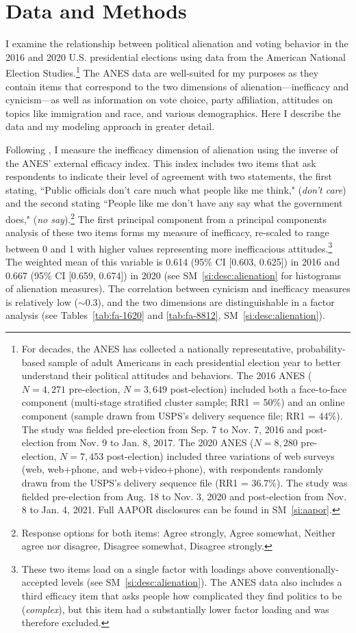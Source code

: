 \documentclass[12pt]{article}
\begin{document}
\section*{Data and Methods}\label{sec:datamethods}
I examine the relationship between political alienation and voting behavior in the 2016 and 2020 U.S. presidential elections using data from the American National Election Studies.\footnote{For decades, the ANES has collected a nationally representative, probability-based sample of adult Americans in each presidential election year to better understand their political attitudes and behaviors. The 2016 ANES ($N = 4,271$ pre-election, $N = 3,649$ post-election) included both a face-to-face component (multi-stage stratified cluster sample; RR1 = 50\%) and an online component (sample drawn from USPS's delivery sequence file; RR1 = 44\%). The study was fielded pre-election from Sep. 7 to Nov. 7, 2016 and post-election from Nov. 9 to Jan. 8, 2017. The 2020 ANES ($N = 8,280$ pre-election, $N = 7,453$ post-election) included three variations of web surveys (web, web+phone, and web+video+phone), with respondents randomly drawn from the USPS's delivery sequence file (RR1 = 36.7\%). The study was fielded pre-election from Aug. 18 to Nov. 3, 2020 and post-election from Nov. 8 to Jan. 4, 2021. Full AAPOR disclosures can be found in SM~\ref{si:aapor}.} The ANES data are well-suited for my purposes as they contain items that correspond to the two dimensions of alienation---inefficacy and cynicism---as well as information on vote choice, party affiliation, attitudes on topics like immigration and race, and various demographics. Here I describe the data and my modeling approach in greater detail.

Following \textcite{mason1985on}, I measure the inefficacy dimension of alienation using the inverse of the ANES' external efficacy index. This index includes two items that ask respondents to indicate their level of agreement with two statements, the first stating, ``Public officials don't care much what people like me think," (\textit{don't care}) and the second stating ``People like me don't have any say what the government does," (\textit{no say}).\footnote{Response options for both items: Agree strongly, Agree somewhat, Neither agree nor disagree, Disagree somewhat, Disagree strongly.} The first principal component from a principal components analysis of these two items forms my measure of inefficacy, re-scaled to range between 0 and 1 with higher values representing more inefficacious attitudes.\footnote{These two items load on a single factor with loadings above conventionally-accepted levels (see SM~\ref{si:desc:alienation}). The ANES data also includes a third efficacy item that asks people how complicated they find politics to be (\textit{complex}), but this item had a substantially lower factor loading and was therefore excluded.} The weighted mean of this variable is 0.614 (95\% CI [0.603, 0.625]) in 2016 and 0.667 (95\% CI [0.659, 0.674]) in 2020 (see SM~\ref{si:desc:alienation} for histograms of alienation measures). The correlation between cynicism and inefficacy measures is relatively low ($\sim$0.3), and the two dimensions are distinguishable in a factor analysis (see Tables~\ref{tab:fa-1620} and \ref{tab:fa-8812}, SM~\ref{si:desc:alienation}). 
\end{document}
